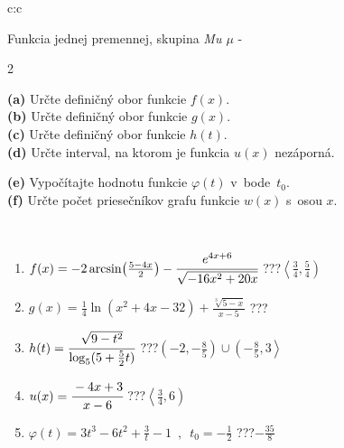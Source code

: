 \documentclass[10pt]{report}
\begin{document}
\begin{tabular}{c:c}
\begin{minipage}[c][104.5mm][t]{0.5\linewidth}
\begin{center}
\vspace{7mm}
{\huge Funkcia jednej premennej, skupina \textit{Mu $\mu$} -}\\[5mm]
\begin{minipage}{0.95\linewidth}
\begin{center}
{\small \begin{multicols}{2} \raggedright
\textbf{(a)} Určte definičný obor funkcie \(f(x)\). \\[1mm]
\textbf{(b)} Určte definičný obor funkcie \(g(x)\). \\[1mm]
\textbf{(c)} Určte definičný obor funkcie \(h(t)\). \\[1mm]
\textbf{(d)} Určte interval, na ktorom je funkcia \(u(x)\) nezáporná. \par \columnbreak
\textbf{(e)} Vypočítajte hodnotu funkcie \(\varphi(t)\) v~bode~\(t_0\). \\[1mm]
\textbf{(f)} Určte počet priesečníkov grafu funkcie \(w(x)\) s~osou \(x\). \\[1mm]
\end{multicols}
}
\end{center}
\end{minipage}
\\[4mm]
\begin{minipage}{0.79\linewidth}
\begin{center}
\begin{varwidth}{\linewidth}
\begin{enumerate}
\small
\item $f(x) = -2\arcsin\!\left( \frac{5-4x}{2} \right) - \cfrac{e^{4x+6}}{\sqrt{-16x^2+20x}}$\quad \dotfill\; ???\;\dotfill \quad $\left\langle\frac{3}{4} , \frac{5}{4}\right)$
\item $g(x) = \frac{1}{4} \ln{\!(x^2+4x-32)}+\frac{\sqrt[3]{5-x}}{x-5}$\quad \dotfill\; ???\;\dotfill {}
\item $h(t) = \cfrac{\sqrt{9-t^2}}{\log_5(5+\frac{5}{2}t)}$\quad \dotfill\; ???\;\dotfill \quad $\left(-2 , -\frac{8}{5}\right)\cup\left(-\frac{8}{5} , 3\right\rangle$
\item $u(x) = \cfrac{-4x+3}{x-6}$\quad \dotfill\; ???\;\dotfill \quad $\left\langle\frac{3}{4} , 6\right)$
\item $\varphi(t) = 3t^3-6t^2+\frac{3}{t}-1 \enspace , \enspace t_0=-\frac{1}{2}$\quad \dotfill\; ???\;\dotfill \quad $-\frac{35}{8}$

\end{enumerate}
\end{varwidth}
\end{center}
\end{minipage}
\end{center}
\end{minipage}
\end{tabular}
\end{document}

